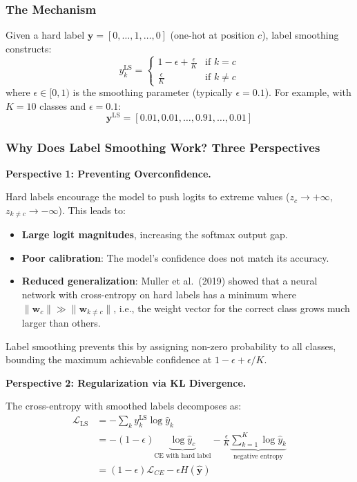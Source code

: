 \subsubsection{The Mechanism}

Given a hard label $\mathbf{y} = [0, \ldots, 1, \ldots, 0]$ (one-hot at position $c$), label smoothing constructs:
\begin{equation}
y_k^{\text{LS}} = 
\begin{cases}
1 - \epsilon + \frac{\epsilon}{K} & \text{if } k = c \\
\frac{\epsilon}{K} & \text{if } k \neq c
\end{cases}
\end{equation}
where $\epsilon \in [0, 1)$ is the smoothing parameter (typically $\epsilon = 0.1$). For example, with $K = 10$ classes and $\epsilon = 0.1$:
\begin{equation}
\mathbf{y}^{\text{LS}} = [0.01, 0.01, \ldots, 0.91, \ldots, 0.01]
\end{equation}

\subsubsection{Why Does Label Smoothing Work? Three Perspectives}

\textbf{Perspective 1: Preventing Overconfidence.}

Hard labels encourage the model to push logits to extreme values ($z_c \to +\infty$, $z_{k \neq c} \to -\infty$). This leads to:
\begin{itemize}
    \item \textbf{Large logit magnitudes}, increasing the softmax output gap.
    \item \textbf{Poor calibration}: The model's confidence does not match its accuracy.
    \item \textbf{Reduced generalization}: Muller et al.\ (2019) showed that a neural network with cross-entropy on hard labels has a minimum where $\|\mathbf{w}_c\| \gg \|\mathbf{w}_{k \neq c}\|$, i.e., the weight vector for the correct class grows much larger than others.
\end{itemize}

Label smoothing prevents this by assigning non-zero probability to all classes, bounding the maximum achievable confidence at $1 - \epsilon + \epsilon/K$.

\textbf{Perspective 2: Regularization via KL Divergence.}

The cross-entropy with smoothed labels decomposes as:
\begin{align}
\mathcal{L}_{\text{LS}} &= -\sum_k y_k^{\text{LS}} \log \hat{y}_k \\
&= -(1 - \epsilon)\underbrace{\log \hat{y}_c}_{\text{CE with hard label}} - \frac{\epsilon}{K}\underbrace{\sum_{k=1}^{K}\log \hat{y}_k}_{\text{negative entropy}} \\
&= (1 - \epsilon)\mathcal{L}_{CE} - \epsilon H(\hat{\mathbf{y}})
\end{align}

